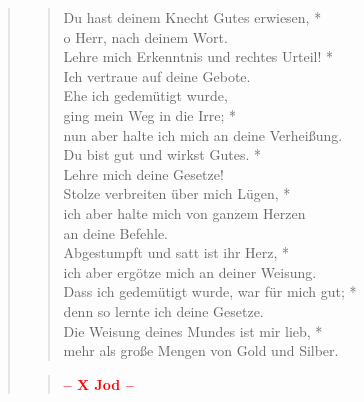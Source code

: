 \begin{quote}
\begin{verse}
Du hast deinem Knecht Gutes erwiesen, *\\
o Herr, nach deinem Wort.\\ 
\vin Lehre mich Erkenntnis und rechtes Urteil! *\\ 
\vin Ich vertraue auf deine Gebote.\\ 
Ehe ich gedemütigt wurde,\\
ging mein Weg in die Irre; *\\
nun aber halte ich mich an deine Verheißung.\\ 
\vin Du bist gut und wirkst Gutes. *\\ 
\vin Lehre mich deine Gesetze!\\ 
Stolze verbreiten über mich Lügen, *\\
ich aber halte mich von ganzem Herzen\\
an deine Befehle.\\ 
\vin Abgestumpft und satt ist ihr Herz, *\\ 
\vin ich aber ergötze mich an deiner Weisung.\\  
Dass ich gedemütigt wurde, war für mich gut; *\\
denn so lernte ich deine Gesetze.\\ 
\vin Die Weisung deines Mundes ist mir lieb, *\\ 
\vin mehr als große Mengen von Gold und Silber.\\  
\end{verse}

\begin{verse}
 
\begin{center}
 \textcolor{red}{\normalsize\bf – X Jod –}\\
\end{center} 


\end{verse}
\end{quote}
